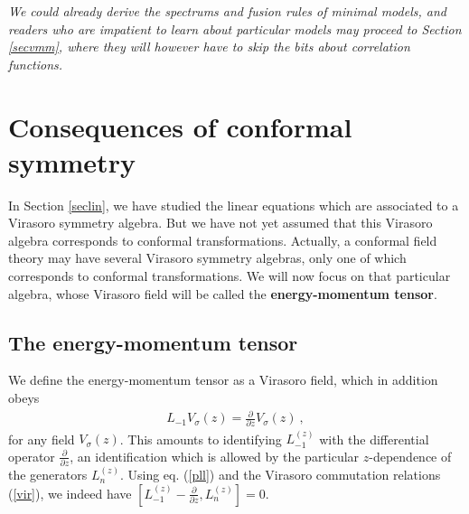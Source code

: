 \documentclass[12pt,a4paper,notitlepage]{report}
\newcommand \p {\partial}
\newcommand \pp[1] {{\frac{\p}{\p #1}}}
\numberwithin{equation}{section}
\theoremstyle{break}
\begin{document}
\vspace{2mm} 
 
\textit{We could already derive the spectrums and fusion rules of minimal models, and readers who are impatient to learn about particular models may proceed to Section \ref{secvmm}, where they will however have to skip the bits about correlation functions.} 


\section{Consequences of conformal symmetry \label{secem}}

In Section \ref{seclin}, we have studied the linear equations which are associated to a Virasoro symmetry algebra. But we have not yet assumed that this Virasoro algebra corresponds to conformal transformations. Actually, a conformal field theory may have several Virasoro symmetry algebras, only one of which corresponds to conformal transformations. We will now focus on that particular algebra, whose
Virasoro field will be called the \textbf{\boldmath energy-momentum tensor}. 

\subsection{The energy-momentum tensor}

We define the energy-momentum tensor as a Virasoro field, which in addition obeys
\begin{align}
 \boxed{L_{-1} V_\sigma (z) = \pp{z} V_\sigma(z)} \ ,
\label{lvpv}
\end{align}
for any field $V_\sigma(z)$. This amounts to identifying $L_{-1}^{(z)}$ with the differential operator $\pp{z}$, an identification which is allowed by the particular $z$-dependence of the generators $L_n^{(z)}$. Using eq. (\ref{pll}) and the Virasoro commutation relations (\ref{vir}), we indeed have $[L_{-1}^{(z)}-\pp{z},L_n^{(z)}]=0$. 
\end{document}

